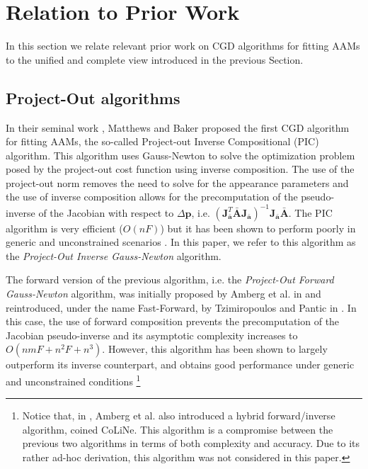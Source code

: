 \section{Relation to Prior Work}
\label{sec:relaltion}

In this section we relate relevant prior work on CGD algorithms for fitting AAMs \cite{Matthews2004, Gross2005, Papandreou2008, Amberg2009, Martins2010, Tzimiropoulos2013, Kossaifi2014} to the unified and complete view introduced in the previous Section.

\subsection{Project-Out algorithms}

In their seminal work \cite{Matthews2004}, Matthews and Baker proposed the first CGD algorithm for fitting AAMs, the so-called Project-out Inverse Compositional (PIC) algorithm. This algorithm uses Gauss-Newton to solve the optimization problem posed by the project-out cost function using inverse composition. The use of the project-out norm removes the need to solve for the appearance parameters and the use of inverse composition allows for the precomputation of the pseudo-inverse of the Jacobian with respect to $\Delta\mathbf{p}$, i.e. $\left( \mathbf{J}_{\bar{\mathbf{a}}}^T\bar{\mathbf{A}}\mathbf{J}_{\bar{\mathbf{a}}} \right)^{-1}\mathbf{J}_{\bar{\mathbf{a}}}\bar{\mathbf{A}}$. The PIC algorithm is very efficient ($O(nF)$) but it has been shown to perform poorly in generic and unconstrained scenarios \cite{Gross2005, Papandreou2008}. In this paper, we refer to this algorithm as the \emph{Project-Out Inverse Gauss-Newton} algorithm.

The forward version of the previous algorithm, i.e. the \emph{Project-Out Forward Gauss-Newton} algorithm, was initially proposed by Amberg et al. in \cite{Amberg2009} and reintroduced, under the name Fast-Forward, by Tzimiropoulos and Pantic in \cite{Tzimiropoulos2013}. In this case, the use of forward composition prevents the precomputation of the Jacobian pseudo-inverse and its asymptotic complexity increases to $O(nmF + n^2F + n^3)$. However, this algorithm has been shown to largely outperform its inverse counterpart, and obtains good performance under generic and unconstrained conditions \cite{Amberg2009, Tzimiropoulos2013}\footnote{Notice that, in \cite{Amberg2009}, Amberg et al. also introduced a hybrid forward/inverse algorithm, coined CoLiNe. This algorithm is a compromise between the previous two algorithms in terms of both complexity and accuracy. Due to its rather ad-hoc derivation, this algorithm was not considered in this paper.}

